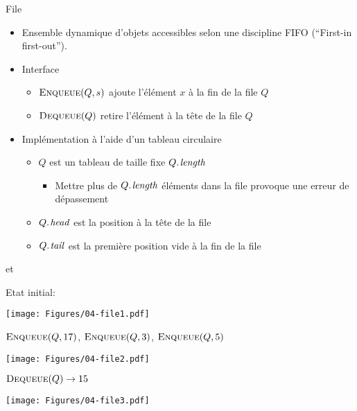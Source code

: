 \begin{frame}{File}
\begin{itemize}
\item Ensemble dynamique d'objets accessibles selon une discipline \alert{FIFO} (``First-in first-out'').
\item Interface
\begin{itemize}
\item $\textnormal{\scshape Enqueue}(Q,s)$ ajoute l'élément $x$ à la fin de la file $Q$
\item $\textnormal{\scshape Dequeue}(Q)$  retire l'élément à la tête de la file $Q$
\end{itemize}

\bigskip

\item Implémentation à l'aide d'un tableau circulaire
\begin{itemize}
\item $Q$ est un tableau de taille fixe $\attrib{Q}{length}$
\begin{itemize}
\item Mettre plus de $\attrib{Q}{length}$ éléments dans la file provoque une erreur de dépassement
\end{itemize}
\item $\attrib{Q}{head}$  est la position à la tête de la file
\item $\attrib{Q}{tail}$ est la première position vide à la fin de la file
\end{itemize}
\end{itemize}
\end{frame}

\begin{frame}{ et }
\begin{small}
Etat initial:
\bigskip
\centerline{\texttt{[image: Figures/04-file1.pdf]}}
$\textnormal{\scshape Enqueue}(Q,17)$, $\textnormal{\scshape Enqueue}(Q,3)$, $\textnormal{\scshape Enqueue}(Q,5)$
\bigskip
\centerline{\texttt{[image: Figures/04-file2.pdf]}}
$\textnormal{\scshape Dequeue}(Q) \rightarrow 15$
\bigskip
\centerline{\texttt{[image: Figures/04-file3.pdf]}}
\end{small}
\end{frame}

